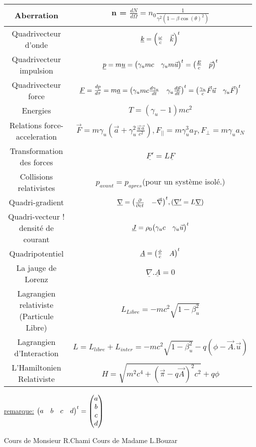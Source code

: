 \documentclass[french]{article}
\begin{document}
\begin{center}
\begin{tabular}{| c | c |}
\hline
Aberration&n = $\frac{dN}{d\Omega}= n_0\frac{1}{\gamma^2\left(1-\beta\cos(\theta)^2\right)}$\\
\hline
Quadrivecteur d’onde&$\underline{k}= \mqty(\frac{\omega}{c} &\vec{k})^t$\\
\hline
Quadrivecteur impulsion&$\underline{p}=m \underline{u}=\mqty(\gamma_u mc & \gamma_u m\vec{u})^t=\mqty(\frac{E}{c}&\vec{p})^t$\\
\hline
Quadrivecteur force&$\underline{F}=\frac{d\underline{p}}{d\tau}= m \underline{a}= \mqty(\gamma_umc\frac{d \gamma_u}{dt}&\gamma_u \frac{d\vec{p}}{dt})^t =\mqty(\frac{\gamma_u}{c}\vec{F}\vec{u}&\gamma_u\vec{F})^t$\\
\hline
Energies&$T = \left(\gamma_u-1\right)mc^2$\\
\hline
Relations force-acceleration&$\vec{F}=m\gamma_u\left(\vec{a}+\gamma_u^2\frac{\vec{u}\vec{a}}{c^2}\right), F_{||}=m\gamma_u^3a_T, F_{\perp}= m\gamma_ua_N$\\
\hline
Transformation des forces&$\underline{F'}= L\underline{F}$\\
\hline
Collisions relativistes&$p_{avant} = p_{apres}$(pour
un système isolé.)\\
\hline
Quadri-gradient&$\underline{\nabla}=\mqty(\pdv{ct}&-\vec{\nabla})^t, (\underline{\nabla'}=L\underline{\nabla})$\\
\hline
Quadri-vecteur ! densité de courant&$\underline{J}= \rho_0\mqty(\gamma_uc&\gamma_u\vec{u})^t$\\
\hline
Quadripotentiel&$\underline{A}=\mqty(\frac{\phi}{c}& A)^t$\\
\hline
La jauge de Lorenz&$\underline{\nabla}.\underline{A}=0$\\
\hline
Lagrangien relativiste (Particule Libre)&$L_{Libre}= -mc^2\sqrt{1-\beta_u^2}$\\
\hline
Lagrangien d’Interaction&$L = L_{libre}+L_{inter}=-mc^2\sqrt{1-\beta_u^2}-q\left(\phi-\vec{A}.\vec{u}\right)$\\
\hline
L’Hamiltonien Relativiste&$H = \sqrt{m^2c^4+\left(\vec{\pi}-q\vec{A}\right)^2c^2}+q\phi$
\\
\hline



		
			
			
			
		\end{tabular}
	\end{center}
\underline{remarque:} $\mqty(a&b&c&d)^t= \mqty(a\\b\\c\\d)$ 
\begin{thebibliography}{9}
	Cours de Monsieur R.Chami
	Cours de Madame L.Bouzar
\end{thebibliography}
\end{document}
